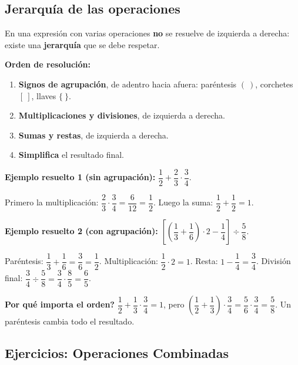 \documentclass[12pt, letterpaper]{article}
\begin{document}
\subsection{Jerarquía de las operaciones}

En una expresión con varias operaciones \textbf{no} se resuelve de izquierda a derecha: existe una \textbf{jerarquía} que se debe respetar.

\begin{cuadroteoria}
  \textbf{Orden de resolución:}
  \begin{enumerate}[leftmargin=*]
    \item \textbf{Signos de agrupación}, de adentro hacia afuera: paréntesis $(\ )$, corchetes $[\ ]$, llaves $\{\ \}$.
    \item \textbf{Multiplicaciones y divisiones}, de izquierda a derecha.
    \item \textbf{Sumas y restas}, de izquierda a derecha.
    \item \textbf{Simplifica} el resultado final.
  \end{enumerate}
\end{cuadroteoria}

\noindent\textbf{Ejemplo resuelto 1 (sin agrupación):} $\dfrac{1}{2} + \dfrac{2}{3} \cdot \dfrac{3}{4}$.

Primero la multiplicación: $\dfrac{2}{3} \cdot \dfrac{3}{4} = \dfrac{6}{12} = \dfrac{1}{2}$. Luego la suma: $\dfrac{1}{2} + \dfrac{1}{2} = 1$.

\noindent\textbf{Ejemplo resuelto 2 (con agrupación):} $\left[\left(\dfrac{1}{3} + \dfrac{1}{6}\right) \cdot 2 - \dfrac{1}{4}\right] \div \dfrac{5}{8}$.

Paréntesis: $\dfrac{1}{3} + \dfrac{1}{6} = \dfrac{3}{6} = \dfrac{1}{2}$. Multiplicación: $\dfrac{1}{2} \cdot 2 = 1$. Resta: $1 - \dfrac{1}{4} = \dfrac{3}{4}$. División final: $\dfrac{3}{4} \div \dfrac{5}{8} = \dfrac{3}{4} \cdot \dfrac{8}{5} = \dfrac{6}{5}$.

\begin{cuadroadvertencia}
  \textbf{\textquestiondown Por qué importa el orden?} $\dfrac{1}{2} + \dfrac{1}{3} \cdot \dfrac{3}{4} = 1$, pero $\left(\dfrac{1}{2} + \dfrac{1}{3}\right) \cdot \dfrac{3}{4} = \dfrac{5}{6} \cdot \dfrac{3}{4} = \dfrac{5}{8}$. Un paréntesis cambia todo el resultado.
\end{cuadroadvertencia}

\subsection{Ejercicios: Operaciones Combinadas}
\end{document}
